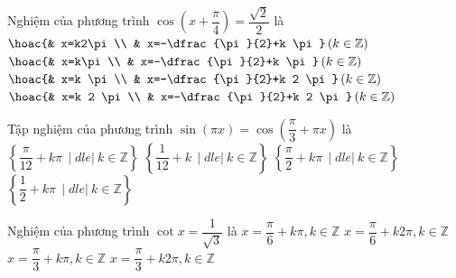 \begin{ex}%
	Nghiệm của phương trình $\cos \left(x+\dfrac{\pi}{4}\right)=\dfrac{\sqrt{2}}{2}$ là 
	 \choice
		{$\hoac{& x=k2\pi \\ &  x=-\dfrac{\pi}{2}+k \pi} \,(k \in \mathbb{Z})$}
		{$\hoac{& x=k\pi \\  & x=-\dfrac{\pi}{2}+k \pi} \,(k \in \mathbb{Z})$}
		{$\hoac{& x=k \pi \\ & x=-\dfrac{\pi}{2}+k 2 \pi} \,(k \in \mathbb{Z})$} 
		{\True $\hoac{& x=k 2 \pi \\ &  x=-\dfrac{\pi}{2}+k 2 \pi} \,(k \in \mathbb{Z})$}
\end{ex}

\begin{ex}%
	Tập nghiệm  của phương trình $\sin(\pi x)=\cos\left(\dfrac{\pi}{3}+\pi x\right)$ là
	\choice 
		{$\left\{\dfrac{\pi}{12}+k\pi\,\mid dle|\  k\in\mathbb{Z}\right\}$}
		{\True $\left\{\dfrac{1}{12}+k\,\mid dle|\ k\in\mathbb{Z}\right\}$} 
		{$\left\{\dfrac{\pi}{2}+k\pi\,\mid  dle|\ k\in\mathbb{Z}\right\}$}
		 {$\left\{\dfrac{1}{2}+k\pi\,\mid dle|\ k\in\mathbb{Z}\right\}$}
\end{ex}

\begin{ex}%
	Nghiệm  của phương trình $\cot x=\dfrac{1}{\sqrt{3}}$ là
	 \choice
		{$x=\dfrac{\pi}{6}+k\pi,  k\in\mathbb{Z}$}
		{$x=\dfrac{\pi}{6}+k2\pi,  k\in\mathbb{Z}$}
		{\True  $x=\dfrac{\pi}{3}+k\pi, k\in\mathbb{Z}$}
		{$x=\dfrac{\pi}{3}+k2\pi,  k\in\mathbb{Z}$}
\end{ex}

